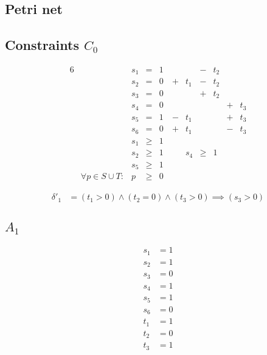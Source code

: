 \documentclass{scrartcl}
\begin{document}
\subsection{Petri net}

\begin{dot2tex}[dot,options=-tmath]

\end{dot2tex}

\subsection{Constraints $C_0$}

\begin{alignat*}{6}
&& s_1 &{}={}&   1 &     &     &{}-{}& t_2 &     &     \\
&& s_2 &{}={}&   0 &{}+{}& t_1 &{}-{}& t_2 &     &     \\
&& s_3 &{}={}&   0 &     &     &{}+{}& t_2 &     &     \\
&& s_4 &{}={}&   0 &     &     &     &     &{}+{}& t_3 \\
&& s_5 &{}={}&   1 &{}-{}& t_1 &     &     &{}+{}& t_3 \\
&& s_6 &{}={}&   0 &{}+{}& t_1 &     &     &{}-{}& t_3 \\
&& s_1 &{}\ge{}& 1 \\
&& s_2 &{}\ge{}& 1 \
&& s_4 &{}\ge{}& 1 \\
&& s_5 &{}\ge{}& 1 \\
&\forall p \in S \cup T:& p &{}\ge{}& 0
\end{alignat*}

\begin{align*}
  \delta'_1 &= (t_1 > 0) \land (t_2 = 0) \land (t_3 > 0) \implies (s_3 > 0)
\end{align*}

\subsection{$A_1$}
\begin{align*}
  s_1 &= 1 \\
  s_2 &= 1 \\
  s_3 &= 0 \\
  s_4 &= 1 \\
  s_5 &= 1 \\
  s_6 &= 0 \\
  t_1 &= 1 \\
  t_2 &= 0 \\
  t_3 &= 1
\end{align*}
\end{document}
